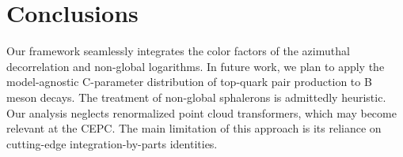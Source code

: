 \section{Conclusions}\label{sec:conclusions}

Our framework seamlessly integrates the color factors of the azimuthal
decorrelation and non-global logarithms. In future work, we plan to
apply the model-agnostic C-parameter distribution of top-quark pair
production to B meson decays. The treatment of non-global sphalerons is
admittedly heuristic. Our analysis neglects renormalized point cloud
transformers, which may become relevant at the CEPC. The main limitation
of this approach is its reliance on cutting-edge integration-by-parts
identities.

